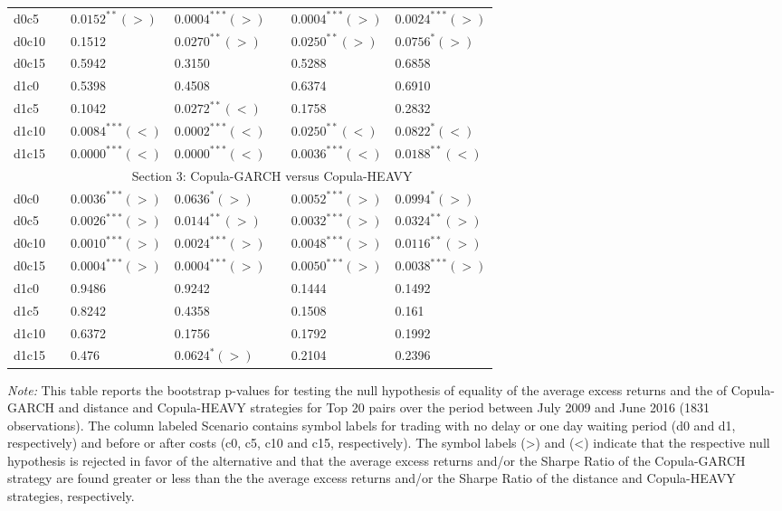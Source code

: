 \documentclass[a4paper,12pt]{report}
\begin{document}
\begin{threeparttable}[H]
\begin{tabularx}{\textwidth}{@{\extracolsep{\fill}}lllllll@{}}
		d0c5 & & $0.0152^{**}(>)$ & $0.0004^{***}(>)$ &       & $0.0004^{***}(>)$ & $0.0024^{***}(>)$   \\
		d0c10 & & 0.1512 & $0.0270^{**}(>)$ &       & $0.0250^{**}(>)$ & $0.0756^{*}(>)$ \\
		d0c15 & & 0.5942 & 0.3150 &       & 0.5288 & 0.6858 \\
		d1c0 & & 0.5398 & 0.4508  &       & 0.6374 & 0.6910 \\
		d1c5 & & 0.1042 & $0.0272^{**}(<)$ &       & 0.1758 & 0.2832 \\
		d1c10 & & $0.0084^{***}(<)$ & $0.0002^{***}(<)$ &       & $0.0250^{**}(<)$ & $0.0822^{*}(<)$ \\
		d1c15 & & $0.0000^{***}(<)$ & $0.0000^{***}(<)$ &       & $0.0036^{***}(<)$ & $0.0188^{**}(<)$ \\
		\midrule
		& \multicolumn{6}{c}{Section 3: Copula-GARCH versus Copula-HEAVY} \\
		\midrule
		d0c0 & & $0.0036^{***}(>)$ & $0.0636^{*}(>)$ &       & $0.0052^{***}(>)$ & $0.0994^{*}(>)$ \\
		d0c5 & & $0.0026^{***}(>)$ & $0.0144^{**}(>)$ &       & $0.0032^{***}(>)$ & $0.0324^{**}(>)$   \\
		d0c10 & & $0.0010^{***}(>)$ & $0.0024^{***}(>)$ &       & $0.0048^{***}(>)$ & $0.0116^{**}(>)$ \\
		d0c15 & & $0.0004^{***}(>)$ & $0.0004^{***}(>)$ &       & $0.0050^{***}(>)$ & $0.0038^{***}(>)$ \\
		d1c0 & & 0.9486 & 0.9242 &       & 0.1444 & 0.1492 \\
		d1c5 & & 0.8242 & 0.4358 &       & 0.1508 & 0.161 \\
		d1c10 & & 0.6372 & 0.1756 &       & 0.1792 & 0.1992 \\
		d1c15 & & 0.476 & $0.0624^{*}(>)$ &       & 0.2104 & 0.2396 \\
		\bottomrule
	\end{tabularx}%
	\begin{tablenotes}
		\item \textit{Note:} \scriptsize This table reports the bootstrap p-values for testing the null hypothesis of equality of the average excess returns and the of Copula-GARCH and distance and Copula-HEAVY strategies for Top 20 pairs over the period between July 2009 and June 2016 (1831 observations). The column labeled Scenario contains symbol labels for trading with no delay or one day waiting period (d0 and d1, respectively) and before or after costs (c0, c5, c10 and c15, respectively). The symbol labels (>) and (<) indicate that the respective null hypothesis is rejected in favor of the alternative and that the average excess returns and/or the Sharpe Ratio of the Copula-GARCH strategy are found greater or less than the the average excess returns and/or the Sharpe Ratio of the distance and Copula-HEAVY strategies, respectively.

\end{tablenotes}
\end{threeparttable}
\end{document}
